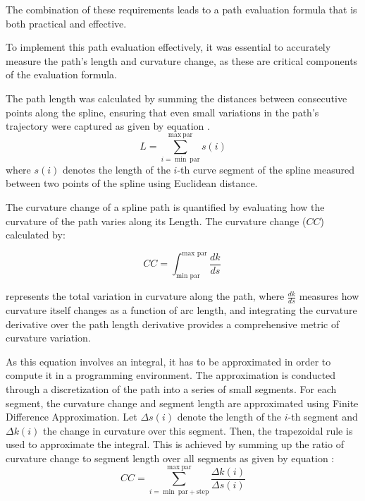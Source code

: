 The combination of these requirements leads to a path evaluation formula that is both practical and effective. 

To implement this path evaluation effectively, it was essential to accurately measure the path's length and curvature 
change, as these are critical components of the evaluation formula. 

The path length was calculated by summing the distances between consecutive points along the spline, ensuring that 
even small variations in the path's trajectory were captured as given by equation .
\begin{equation}
    L = \sum_{i=\min \ \text{par}}^{\max \ \text{par}} s(i)
    \label{length_formula}
\end{equation}
where \( s(i) \) denotes the length of the \(i\)-th curve segment of the spline measured between two points of the 
spline using Euclidean distance.

The curvature change of a spline path is quantified by evaluating how the curvature of the path varies along its Length.
The curvature change (\( CC\)) calculated by:

\begin{equation}
    CC = \int_{\text{min par}}^{\text{max par}} \frac{dk}{ds} \
    \end{equation}
    

represents the total variation in curvature along the path, where \( \frac{dk}{ds} \) measures how curvature itself 
changes as a function of arc length, and integrating the curvature derivative over the path length derivative 
provides a comprehensive metric of curvature variation.

As this equation involves an integral, it has to be approximated in order to compute it in a programming environment.
The approximation is conducted through a discretization of the path into a series of small segments. For each segment, 
the curvature change and segment length are approximated using Finite Difference Approximation. 
Let \( \Delta s(i) \) denote the length of the \(i\)-th segment 
and \( \Delta k(i) \) the change in curvature over this segment.
Then, the trapezoidal rule is used to approximate the integral. 
This is achieved by summing up the ratio of curvature change to segment length over all segments as given by 
equation \Ref{curvature_change}:
\begin{equation}
CC = \sum_{i = \min \ \text{par} + \text{step}}^{\max \ \text{par}} \frac{\Delta k(i)}{\Delta s(i)}
\label{curvature_change}
\end{equation}


